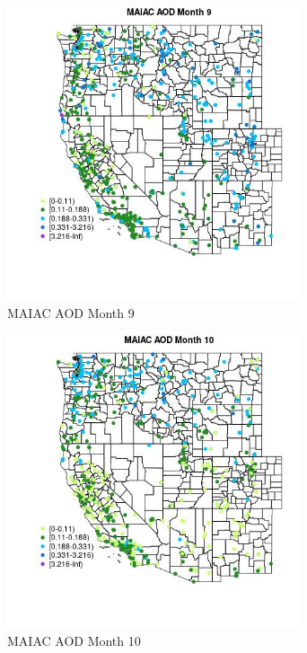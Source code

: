 \begin{figure} 
\centering  
\includegraphics[width=0.77\textwidth]{Code_Outputs/Report_ML_input_PM25_Step4_part_e_de_duplicated_aves_compiled_2019-05-14wNAs_MapObsMo9MAIAC_AOD.jpg} 
\caption{\label{fig:Report_ML_input_PM25_Step4_part_e_de_duplicated_aves_compiled_2019-05-14wNAsMapObsMo9MAIAC_AOD}MAIAC AOD Month 9} 
\end{figure} 
 

\clearpage 

\begin{figure} 
\centering  
\includegraphics[width=0.77\textwidth]{Code_Outputs/Report_ML_input_PM25_Step4_part_e_de_duplicated_aves_compiled_2019-05-14wNAs_MapObsMo10MAIAC_AOD.jpg} 
\caption{\label{fig:Report_ML_input_PM25_Step4_part_e_de_duplicated_aves_compiled_2019-05-14wNAsMapObsMo10MAIAC_AOD}MAIAC AOD Month 10} 
\end{figure} 
 

